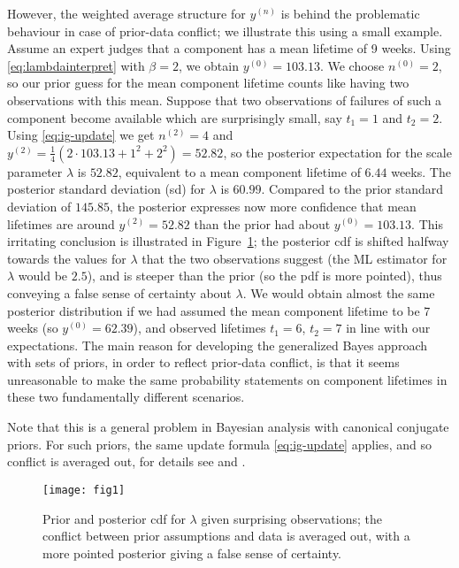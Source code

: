 \documentclass[Journal,letterpaper]{ascelike-new}
\newcommand{\uz}{^{(0)}} %
\newcommand{\un}{^{(n)}} %
\def\yz{y\uz}
\def\yn{y\un}
\newcommand{\yfun}[1]{y^{({#1})}}
\def\nz{n\uz}
\newcommand{\nfun}[1]{n^{({#1})}}
\begin{document}
However, the weighted average structure for $\yn$
is behind the problematic behaviour in case of prior-data conflict; we
illustrate this using a small example. Assume an expert judges that a component
has a mean lifetime of 9 weeks.
Using \eqref{eq:lambdainterpret} with $\beta=2$, we obtain $\yz = 103.13$.
We choose $\nz = 2$, so our prior guess for the mean component lifetime
counts like having two observations with this mean.
Suppose that two observations of failures of such a component become available which
are surprisingly small, say $t_1 = 1$ and $t_2 = 2$.
Using \eqref{eq:ig-update} we get $\nfun{2} = 4$
and $\yfun{2} = \frac{1}{4}(2 \cdot 103.13 + 1^2 + 2^2) = 52.82$,
so the posterior expectation for the scale parameter $\lambda$ is $52.82$,
equivalent to a mean component lifetime of $6.44$ weeks.
The posterior standard deviation (sd) for $\lambda$ is $60.99$.
Compared to the prior standard deviation of $145.85$,
the posterior expresses now more confidence that mean lifetimes are around $\yfun{2} = 52.82$
than the prior had about $\yz = 103.13$.
This irritating conclusion is illustrated in Figure~\ref{fig:weibull-pdc};
the posterior cdf is shifted halfway towards the values for $\lambda$
that the two observations suggest
(the ML estimator for $\lambda$ would be $2.5$),
and is steeper than the prior (so the pdf is more pointed),
thus conveying a false sense of certainty about $\lambda$.
We would obtain almost the same 
posterior distribution
if we had assumed the mean component lifetime to be 7 weeks (so $\yz = 62.39$),
and observed lifetimes $t_1 = 6$, $t_2 = 7$ in line with our expectations.
The main reason for developing the generalized Bayes approach with sets of priors, in order
to reflect prior-data conflict, is that it seems unreasonable to make the same probability 
statements on component lifetimes in these two fundamentally different scenarios.

Note that this is a general problem in Bayesian analysis with canonical conjugate priors.
For such priors, the same update formula \eqref{eq:ig-update} applies,
and so conflict is averaged out, for details see  and .

\begin{figure}
\centering
\texttt{[image: fig1]}
\caption{Prior and posterior cdf for $\lambda$ given surprising observations;
the conflict between prior assumptions and data is averaged out,
with a more pointed posterior giving a false sense of certainty.}
\label{fig:weibull-pdc}
\end{figure}
\end{document}
